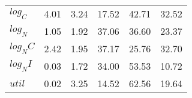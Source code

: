 \begin{center}
\begin{longtable}{lccccc}
$log_C         $	 & 	        4.01	 & 	        3.24	 & 	       17.52	 & 	       42.71	 & 	       32.52 \\ 
$log_N         $	 & 	        1.05	 & 	        1.92	 & 	       37.06	 & 	       36.60	 & 	       23.37 \\ 
$log_NC        $	 & 	        2.42	 & 	        1.95	 & 	       37.17	 & 	       25.76	 & 	       32.70 \\ 
$log_NI        $	 & 	        0.03	 & 	        1.72	 & 	       34.00	 & 	       53.53	 & 	       10.72 \\ 
$util          $	 & 	        0.02	 & 	        3.25	 & 	       14.52	 & 	       62.56	 & 	       19.64 \\ 
\end{longtable}
 \end{center}
